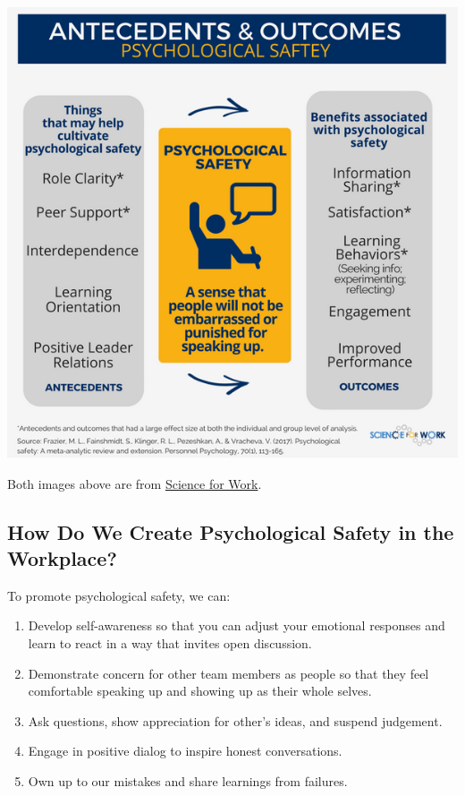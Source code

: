 \documentclass[
  letterpaper,
  DIV=11,
  numbers=noendperiod]{scrreprt}
\providecommand{\tightlist}{%
  \setlength{\itemsep}{0pt}\setlength{\parskip}{0pt}}\usepackage{longtable,booktabs,array}
\begin{document}
\includegraphics{_img/ANTECEDENTSOUTCOMES_PsychSafety_Science4Work_icon.png}

Both images above are from
\href{https://scienceforwork.com/blog/psychological-safety/}{Science for
Work}.

\subsection{How Do We Create Psychological Safety in the
Workplace?}\label{how-do-we-create-psychological-safety-in-the-workplace}

To promote psychological safety, we can:

\begin{enumerate}
\def\labelenumi{\arabic{enumi}.}
\tightlist
\item
  Develop self-awareness so that you can adjust your emotional responses
  and learn to react in a way that invites open discussion.\\
\item
  Demonstrate concern for other team members as people so that they feel
  comfortable speaking up and showing up as their whole selves.\\
\item
  Ask questions, show appreciation for other's ideas, and suspend
  judgement.\\
\item
  Engage in positive dialog to inspire honest conversations.\\
\item
  Own up to our mistakes and share learnings from failures.
\end{enumerate}
\end{document}
